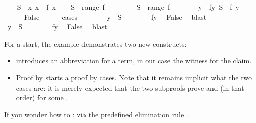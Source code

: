 \begin{isabellebody}
%
\isadelimproof
%
\endisadelimproof
%
\isatagproof
{}\isamarkupfalse%
\isanewline
\ \ \isamarkupfalse%
\ {\isacharquery}S\ {\isacharequal}\ {\isachardoublequoteopen}{\isacharbraceleft}x{\isachardot}\ x\ {\isasymnotin}\ f\ x{\isacharbraceright}{\isachardoublequoteclose}\isanewline
\ \ \isamarkupfalse%
\ {\isachardoublequoteopen}{\isacharquery}S\ {\isasymnotin}\ range\ f{\isachardoublequoteclose}\isanewline
\ \ \isamarkupfalse%
\isanewline
\ \ \ \ \isamarkupfalse%
\ {\isachardoublequoteopen}{\isacharquery}S\ {\isasymin}\ range\ f{\isachardoublequoteclose}\isanewline
\ \ \ \ \isamarkupfalse%
\ \isamarkupfalse%
\ y\ \ fy{\isacharcolon}\ {\isachardoublequoteopen}{\isacharquery}S\ {\isacharequal}\ f\ y{\isachardoublequoteclose}\ \isacommand{{\isachardot}{\isachardot}}\isamarkupfalse%
\isanewline
\ \ \ \ \isamarkupfalse%
\ False\isanewline
\ \ \ \ \isamarkupfalse%
\ cases\isanewline
\ \ \ \ \ \ \isamarkupfalse%
\ {\isachardoublequoteopen}y\ {\isasymin}\ {\isacharquery}S{\isachardoublequoteclose}\isanewline
\ \ \ \ \ \ \isamarkupfalse%
\ fy\ \isamarkupfalse%
\ False\ \isamarkupfalse%
\ blast\isanewline
\ \ \ \ \isamarkupfalse%
\isanewline
\ \ \ \ \ \ \isamarkupfalse%
\ {\isachardoublequoteopen}y\ {\isasymnotin}\ {\isacharquery}S{\isachardoublequoteclose}\isanewline
\ \ \ \ \ \ \isamarkupfalse%
\ fy\ \isamarkupfalse%
\ False\ \isamarkupfalse%
\ blast\isanewline
\ \ \ \ \isamarkupfalse%
\isanewline
\ \ \isamarkupfalse%
\isanewline
{}\isamarkupfalse%
%
\endisatagproof
{\isafoldproof}%
%
\isadelimproof
%
\endisadelimproof
%
\begin{isamarkuptext}%
\noindent
For a start, the example demonstrates two new constructs:
\begin{itemize}
\item {} introduces an abbreviation for a term, in our case
the witness for the claim.
\item Proof by  starts a proof by cases. Note that it remains
implicit what the two cases are: it is merely expected that the two subproofs
prove  and  (in that order)
for some .
\end{itemize}
If you wonder how to  :
via the predefined elimination rule .


\end{isamarkuptext}
\end{isabellebody}
